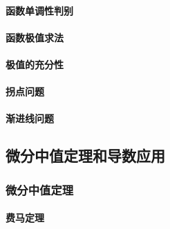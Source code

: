 \documentclass[
]{article}
\begin{document}
\hypertarget{ux51fdux6570ux5355ux8c03ux6027ux5224ux522b}{%
\paragraph{函数单调性判别}\label{ux51fdux6570ux5355ux8c03ux6027ux5224ux522b}}

\hypertarget{ux51fdux6570ux6781ux503cux6c42ux6cd5}{%
\paragraph{函数极值求法}\label{ux51fdux6570ux6781ux503cux6c42ux6cd5}}

\hypertarget{ux6781ux503cux7684ux5145ux5206ux6027}{%
\paragraph{极值的充分性}\label{ux6781ux503cux7684ux5145ux5206ux6027}}

\hypertarget{ux62d0ux70b9ux95eeux9898}{%
\paragraph{拐点问题}\label{ux62d0ux70b9ux95eeux9898}}

\hypertarget{ux6e10ux8fdbux7ebfux95eeux9898}{%
\paragraph{渐进线问题}\label{ux6e10ux8fdbux7ebfux95eeux9898}}

\hypertarget{ux5faeux5206ux4e2dux503cux5b9aux7406ux548cux5bfcux6570ux5e94ux7528}{%
\subsection{微分中值定理和导数应用}\label{ux5faeux5206ux4e2dux503cux5b9aux7406ux548cux5bfcux6570ux5e94ux7528}}

\hypertarget{ux5faeux5206ux4e2dux503cux5b9aux7406}{%
\subsubsection{微分中值定理}\label{ux5faeux5206ux4e2dux503cux5b9aux7406}}

\hypertarget{ux8d39ux9a6cux5b9aux7406}{%
\paragraph{费马定理}\label{ux8d39ux9a6cux5b9aux7406}}
\end{document}
